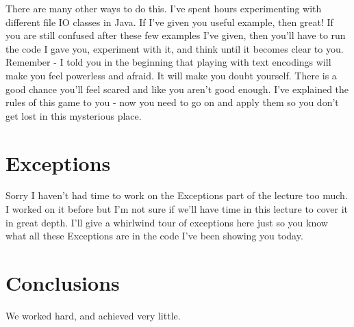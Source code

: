 \documentclass[12pt]{article}
\begin{document}
There are many other ways to do this. I've spent hours experimenting with different file IO classes in Java. If I've given you useful example, then great! If you are still confused after these few examples I've given, then you'll have to run the code I gave you, experiment with it, and think until it becomes clear to you. Remember -  I told you in the beginning that playing with text encodings will make you feel powerless and afraid. It will make you doubt yourself. There is a good chance you'll feel scared and like you aren't good enough. I've explained the rules of this game to you - now you need to go on and apply them so you don't get lost in this mysterious place.

\section{Exceptions}

Sorry I haven't had time to work on the Exceptions part of the lecture too much. I worked on it before but I'm not sure if we'll have time in this lecture to cover it in great depth. I'll give a whirlwind tour of exceptions here just so you know what all these Exceptions are in the code I've been showing you today.

\section{Conclusions}\label{conclusions}
We worked hard, and achieved very little.
\end{document}
